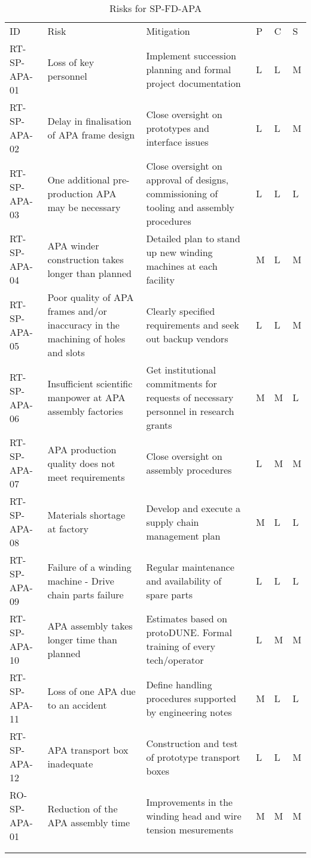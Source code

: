 
\begin{longtable}{p{}p{}p{}p{}p{}p{}} 
\caption{Risks for SP-FD-APA } \\
\rowcolor{dunesky}
ID & Risk & Mitigation & P & C & S  \\  \colhline
RT-SP-APA-01 & Loss of key personnel & Implement succession planning and formal project documentation & L & L & M \\  \colhline
RT-SP-APA-02 & Delay in finalisation of APA frame design & Close oversight on prototypes and interface issues & L & L & M \\  \colhline
RT-SP-APA-03 & One additional pre-production APA may be necessary & Close oversight on approval of designs, commissioning of tooling and assembly procedures & L & L & L \\  \colhline
RT-SP-APA-04 & APA winder construction takes longer than planned & Detailed plan to stand up new winding machines at each facility & M & L & M \\  \colhline
RT-SP-APA-05 & Poor quality of APA frames and/or inaccuracy in the machining of holes and slots & Clearly specified requirements and seek out backup vendors & L & L & M \\  \colhline
RT-SP-APA-06 & Insufficient scientific manpower at APA assembly factories & Get institutional commitments for requests of necessary personnel in research grants & M & M & L \\  \colhline
RT-SP-APA-07 & APA production quality does not meet requirements & Close oversight on assembly procedures & L & M & M \\  \colhline
RT-SP-APA-08 & Materials shortage at factory & Develop and execute a supply chain management plan & M & L & L \\  \colhline
RT-SP-APA-09 & Failure of a winding machine - Drive chain parts failure & Regular maintenance and availability of spare parts & L & L & L \\  \colhline
RT-SP-APA-10 & APA assembly takes longer time than planned  & Estimates based on protoDUNE. Formal training of every tech/operator & L & M & M \\  \colhline
RT-SP-APA-11 & Loss of one APA due to an accident & Define handling procedures supported by engineering notes & M & L & L \\  \colhline
RT-SP-APA-12 & APA transport box inadequate & Construction and test of prototype transport boxes & L & L & M \\  \colhline
RO-SP-APA-01 & Reduction of the APA assembly time & Improvements in the winding head and wire tension mesurements & M & M & M \\  \colhline
 &  &  &  &  &  \\  \colhline

\label{tab:risks:SP-FD-APA}
\end{longtable}